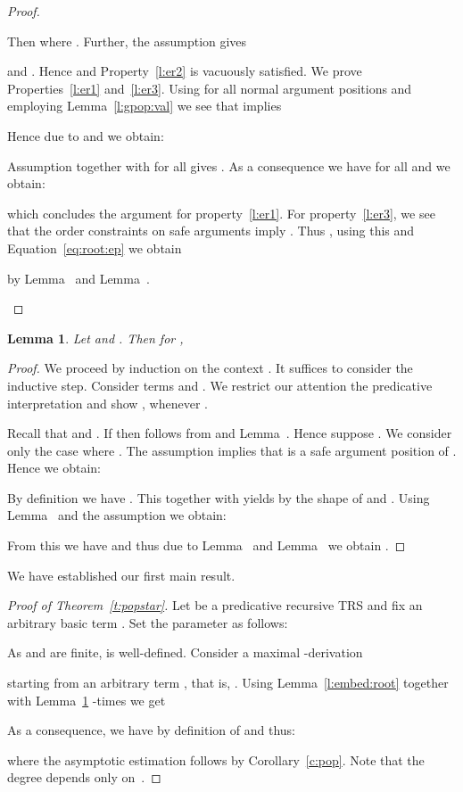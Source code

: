 \documentclass{LMCS}
\newtheorem{lemma}[thm]{Lemma}
\begin{document}
\begin{proof}
\begin{description}[leftmargin=0.3cm]
  \item[\dcase{}]
    Then  where .
    Further, the assumption gives
    
    and .
    Hence  and Property~\ref{l:er2} is vacuously 
    satisfied. 
    We prove Properties~\ref{l:er1} and~\ref{l:er3}.
    Using  for all normal argument positions 
    and employing Lemma~\ref{l:gpop:val} we see that
     implies

Hence due to 
     and 
    we obtain:
    
Assumption  together with
     for all  gives
    . As a consequence we have  for all
     and we obtain:

    which concludes the argument for property~\ref{l:er1}.
For property~\ref{l:er3}, 
    we see that the order constraints on safe arguments 
    imply . 
    Thus , 
    using this and Equation~\eqref{eq:root:ep} we obtain 
    
    by Lemma~ and Lemma~.\qedhere
  \end{description}
\end{proof}

\begin{lemma}
  \label{l:embed:ctx}
  Let  and . Then for , 
  
\end{lemma}
\begin{proof}
We proceed by induction on the context . 
It suffices to consider the inductive step.
Consider terms  and 
. We restrict our attention
the predicative interpretation  and show , whenever 
. 

Recall that  and .
If  then  follows 
from  and Lemma~.
Hence suppose .
We consider only the case where .
The assumption  
implies that  is a safe argument position of . 
Hence we obtain:

By definition we have . This together
with  yields  
by the shape of  and .
Using Lemma~ and the assumption 
we obtain:

From this we have 
and thus due to Lemma~
and Lemma~ we obtain 
.\qedhere


\end{proof}

We have established our first main result.
\begin{proof}[Proof of Theorem~\ref{t:popstar}]
  Let  be a predicative recursive TRS and fix an 
  arbitrary basic term . 
  Set the parameter  as follows:

As  and  are finite,  is well-defined.
Consider a maximal -derivation
  
  starting from an arbitrary term , that is, .
  Using Lemma~\ref{l:embed:root} together with Lemma~\ref{l:embed:ctx} -times 
  we get 
  
  As a consequence, we have  by definition
of  and thus:

where the asymptotic estimation follows by Corollary~\ref{c:pop}.
Note that the degree  depends only on~.
\end{proof}
\end{document}
